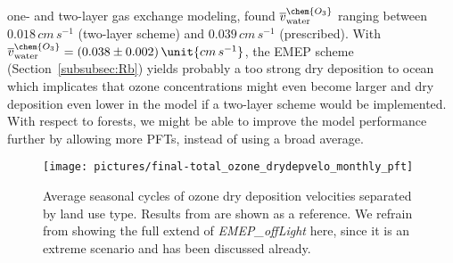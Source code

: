 \documentclass[gmd, manuscript]{copernicus}
\begin{document}
one- and two-layer gas exchange modeling, \citet{ACP:Luhar2017} found $\overline{v}_\text{water}^\chem{O_3}$ ranging between $0.018\,\unit{cm\,s^{-1}}$ (two-layer scheme) and $0.039\,\unit{cm\,s^{-1}}$ (prescribed). With $\overline{v}^\chem{O_3}_\text{water} = (0.038\pm0.002)\,\unit{cm\,s^{-1}}$, the EMEP scheme (Section~\ref{subsubsec:Rb}) yields probably a too strong dry deposition to ocean which implicates that ozone concentrations might even become larger and dry deposition even lower in the model if a two-layer scheme would be implemented. With respect to forests, we might be able to improve the model performance further by allowing more PFTs, instead of using a broad average. 
%
\begin{figure*}[t]
  \texttt{[image: pictures/final-total\_ozone\_drydepvelo\_monthly\_pft]}
  \caption{Average seasonal cycles of ozone dry deposition velocities separated by land use type. Results from \citep{ACP:Hardacre2015} are shown as a reference. We refrain from showing the full extend of \emph{EMEP\_offLight} here, since it is an extreme scenario and has been discussed already.}
  \label{fig:mmm_drydep_season_pft}
\end{figure*}
%
\end{document}
